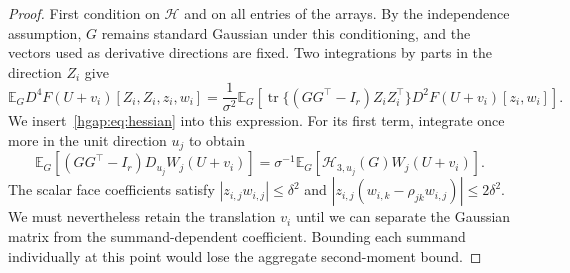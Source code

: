 \documentclass[11pt,letterpaper]{article}
\theoremstyle{remark}
\newcommand{\E}{\mathbb E}
\newcommand{\tr}{\operatorname{tr}}
\begin{document}
\begin{proof}
First condition on $\mathcal H$ and on all entries of the arrays.
By the independence assumption, $G$ remains standard Gaussian under
this conditioning, and the vectors used as derivative directions are
fixed. Two integrations by parts in the direction $Z_i$ give
\[
 \E_G D^4F(U+v_i)[Z_i,Z_i,z_i,w_i]
 =\frac1{\sigma^2}\E_G\left[
       \tr\{(GG^\top-I_r)Z_iZ_i^\top\}
                       D^2F(U+v_i)[z_i,w_i]\right].
\]
We insert~\eqref{hgap:eq:hessian} into this expression. For its first term, integrate once more
in the unit direction $u_j$ to obtain
\[
 \E_G[(GG^\top-I_r)D_{u_j}W_j(U+v_i)]
 =\sigma^{-1}\E_G[\mathcal H_{3,u_j}(G)W_j(U+v_i)].
\]
The scalar face coefficients satisfy
$|z_{i,j}w_{i,j}|\le\delta^2$ and
$|z_{i,j}(w_{i,k}-\rho_{jk}w_{i,j})|\le2\delta^2$.
We must nevertheless retain the translation $v_i$ until we can
separate the Gaussian matrix from the summand-dependent coefficient.
Bounding each summand individually at this point would lose the
aggregate second-moment bound.


\end{proof}
\end{document}
